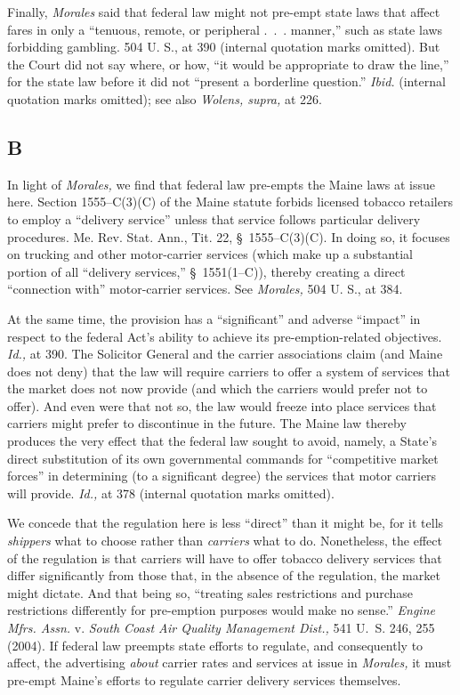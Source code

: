 {{  Finally, \emph{Morales} said that federal law might not pre-empt state
laws that affect fares in only a ``tenuous, remote, or peripheral
.~.~. manner,'' such as state laws forbidding gambling. 504 U.
S., at 390 (internal quotation marks omitted). But the Court did not
say where, or how, ``it would be appropriate to draw the line,'' for
the state law before it did not ``present a borderline question.''
\emph{Ibid.} (internal quotation marks omitted); see also \emph{Wolens,
supra,} at 226.

\subsection{B}

  In light of \emph{Morales,} we find that federal law pre-empts the Maine
laws at issue here. Section 1555--C(3)(C) of the Maine statute forbids
licensed tobacco retailers to employ a ``delivery service'' unless
that service follows particular delivery procedures. Me. Rev. Stat.
Ann., Tit. 22, \S~1555--C(3)(C). In doing so, it focuses on trucking
and other motor-carrier services (which make up a substantial portion of
all ``delivery services,'' \S~1551(1--C)), thereby creating a
direct ``connection with'' motor-carrier services. See \emph{Morales,}
504 U. S., at 384.

  At the same time, the provision has a ``significant'' and adverse
``impact'' in respect to the federal Act's ability to \newpage 
achieve its pre-emption-related objectives. \emph{Id.,} at 390. The
Solicitor General and the carrier associations claim (and Maine does not
deny) that the law will require carriers to offer a system of services
that the market does not now provide (and which the carriers would
prefer not to offer). And even were that not so, the law would freeze
into place services that carriers might prefer to discontinue in the
future. The Maine law thereby produces the very effect that the federal
law sought to avoid, namely, a State's direct substitution of its own
governmental commands for ``competitive market forces'' in determining
(to a significant degree) the services that motor carriers will provide.
\emph{Id.,} at 378 (internal quotation marks omitted).

  We concede that the regulation here is less ``direct'' than
it might be, for it tells \emph{shippers} what to choose rather than
\emph{carriers} what to do. Nonetheless, the effect of the regulation is
that carriers will have to offer tobacco delivery services that differ
significantly from those that, in the absence of the regulation, the
market might dictate. And that being so, ``treating sales restrictions
and purchase restrictions differently for pre-emption purposes would
make no sense.'' \emph{Engine Mfrs. Assn.} v. \emph{South Coast Air
Quality Management Dist.,} 541 U.~S. 246, 255 (2004). If federal
law preempts state efforts to regulate, and consequently to affect,
the advertising \emph{about} carrier rates and services at issue in
\emph{Morales,} it must pre-empt Maine's efforts to regulate carrier
delivery services themselves.

}}
